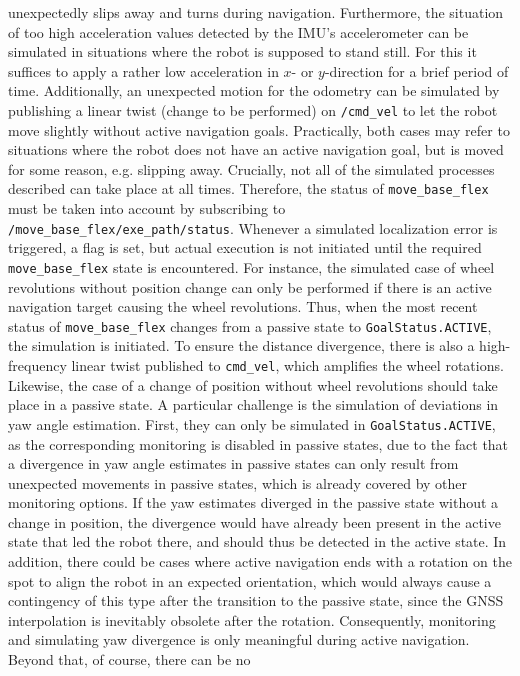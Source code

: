 \documentclass[english, master, utf8]{base/thesis_KBS}
\newcommand{\code}[1]{\colorbox{light-gray}{\texttt{#1}}}
\begin{document}
unexpectedly slips away and turns during navigation.
Furthermore, the situation of too high acceleration values detected by the IMU's accelerometer can be simulated in situations
where the robot is supposed to stand still. For this it suffices to apply a rather low acceleration in $x$- or $y$-direction for a brief period of time. Additionally, an unexpected
motion for the odometry can be simulated by publishing a linear twist (change to be performed) on \code{/cmd\_vel} to let the robot move slightly without active navigation goals.
Practically, both cases may refer to situations where the
robot does not have an active navigation goal, but is moved for some reason, e.g. slipping away. Crucially, not all of the simulated processes described can take place at all times.
Therefore, the status of \code{move\_base\_flex} must be taken into account by subscribing to \code{/move\_base\_flex/exe\_path/status}. Whenever a simulated localization error is
triggered, a flag is set, but actual execution is not initiated until the required \code{move\_base\_flex} state is encountered. For instance, the simulated case of wheel revolutions
without position change can only be performed if there is an active navigation target causing the wheel revolutions. Thus, when the most recent status of \code{move\_base\_flex}
changes from a passive state to \code{GoalStatus.ACTIVE}, the simulation is initiated. To ensure the distance divergence, there is also a high-frequency linear twist published to
\code{cmd\_vel}, which amplifies the wheel rotations. Likewise, the case of a change of position without wheel revolutions should take place in a
passive state. A particular challenge is the simulation of deviations in yaw angle estimation. First, they can only be simulated in \code{GoalStatus.ACTIVE}, as the corresponding
monitoring is disabled in passive states, due to the fact that a divergence in yaw angle estimates in passive states can only result from unexpected movements in passive states,
which is already covered by other monitoring options. If the yaw estimates diverged in the passive state without a change in position, the divergence would have already been present
in the active state that led the robot there, and should thus be detected in the active state. In addition, there could be cases where active navigation ends with a rotation on the
spot to align the robot in an expected orientation, which would always cause a contingency of this type after the transition to the passive state, since the GNSS interpolation is
inevitably obsolete after the rotation. Consequently, monitoring and simulating yaw divergence is only meaningful during active navigation. Beyond that, of course, there can be no
\end{document}
